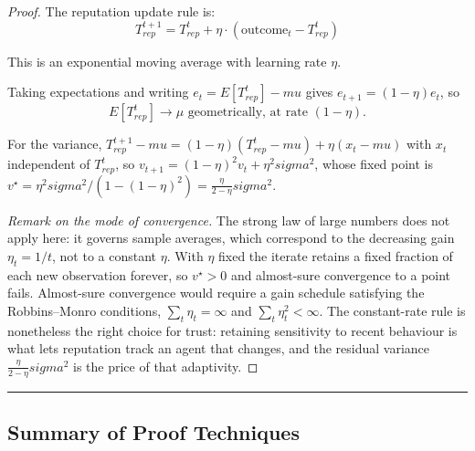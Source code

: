 \documentclass[
]{article}
\newcounter{none} %
\begin{document}
\begin{proof}
The reputation update rule is:
\begin{equation}
\label{eq:reputation-update}
T_{rep}^{t+1} = T_{rep}^t + \eta \cdot (\text{outcome}_t - T_{rep}^t)
\end{equation}

This is an exponential moving average with learning rate $\eta$.

Taking expectations and writing $e_t = E[T_{rep}^t] - mu$ gives
$e_{t+1} = (1 - \eta) e_t$, so
\begin{equation}
\label{eq:convergence-limit}
E[T_{rep}^t] \to \mu \text{ geometrically, at rate } (1 - \eta).
\end{equation}

For the variance, $T_{rep}^{t+1} - mu = (1-\eta)(T_{rep}^t - mu) + \eta(x_t - mu)$
with $x_t$ independent of $T_{rep}^t$, so
$v_{t+1} = (1-\eta)^2 v_t + \eta^2 sigma^2$, whose fixed point is
$v^\star = \eta^2sigma^2 / (1 - (1-\eta)^2) = \frac{\eta}{2-\eta}sigma^2$.

\emph{Remark on the mode of convergence.} The strong law of large numbers does
not apply here: it governs sample averages, which correspond to the decreasing
gain $\eta_t = 1/t$, not to a constant $\eta$. With $\eta$ fixed the iterate
retains a fixed fraction of each new observation forever, so $v^\star > 0$ and
almost-sure convergence to a point fails. Almost-sure convergence would require
a gain schedule satisfying the Robbins--Monro conditions,
$\sum_t \eta_t = \infty$ and $\sum_t \eta_t^2 < \infty$. The constant-rate rule
is nonetheless the right choice for trust: retaining sensitivity to recent
behaviour is what lets reputation track an agent that changes, and the residual
variance $\frac{\eta}{2-\eta}sigma^2$ is the price of that adaptivity.
\end{proof}

\begin{center}\rule{0.5\linewidth}{0.5pt}\end{center}

\subsection{Summary of Proof Techniques}\label{sec:proof-summary}
\end{document}
